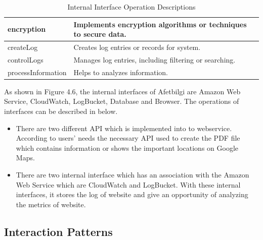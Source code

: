 \begin{center}
\begin{table}[H]
\begin{tabular}{| m{6cm}| m{8cm} |}
            \hline
            encryption & Implements encryption algorithms or techniques to secure data.\\
            \hline
            createLog & Creates log entries or records for system.\\
            \hline
            controlLogs & Manages log entries, including filtering or searching.\\
            \hline
            processInformation & Helps to analyzes information.\\
            \hline
        \end{tabular}
        \caption[Internal Interface Operation Descriptions]{Internal Interface Operation Descriptions}
    \end{table}
\end{center}

As shown in Figure 4.6, the internal interfaces of Afetbilgi are Amazon Web Service, CloudWatch, LogBucket, Database and Browser. The operations of interfaces can be described in below. \\

\begin{itemize}
    \item There are two different API which is implemented into to webservice. According to users' needs the necessary API used to create the PDF file which contains information or shows the important locations on Google Maps.
    \item There are two internal interface which has an association with the Amazon Web Service which are CloudWatch and LogBucket. With these internal interfaces, it stores the log of website and give an opportunity of analyzing the metrics of website.
\end{itemize}

\subsection{Interaction Patterns}

